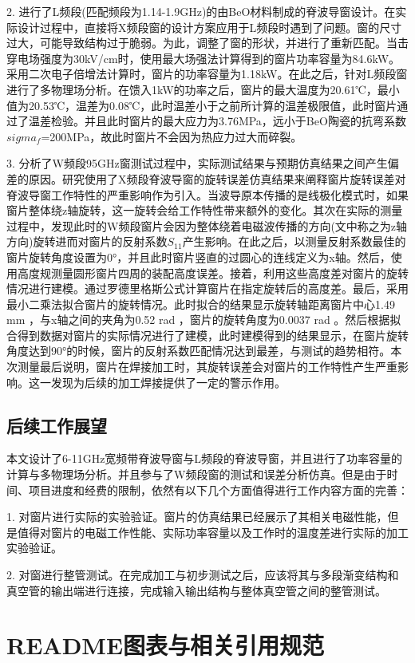 \documentclass[master]{thesis-uestc}
\begin{document}
2. 进行了L频段(匹配频段为1.14-1.9GHz)的由BeO材料制成的脊波导窗设计。在实际设计过程中，直接将X频段窗的设计方案应用于L频段时遇到了问题。窗的尺寸过大，可能导致结构过于脆弱。为此，调整了窗的形状，并进行了重新匹配。当击穿电场强度为30kV/cm时，使用最大场强法计算得到的窗片功率容量为84.6kW。采用二次电子倍增法计算时，窗片的功率容量为1.18kW。在此之后，针对L频段窗进行了多物理场分析。在馈入1kW的功率之后，窗片的最大温度为20.61℃，最小值为20.53℃，温差为0.08℃，此时温差小于之前所计算的温差极限值，此时窗片通过了温差检验。并且此时窗片的最大应力为3.76MPa，远小于BeO陶瓷的抗弯系数\(sigma_f\)=200MPa，故此时窗片不会因为热应力过大而碎裂。

3. 分析了W频段95GHz窗测试过程中，实际测试结果与预期仿真结果之间产生偏差的原因。研究使用了X频段脊波导窗的旋转误差仿真结果来阐释窗片旋转误差对脊波导窗工作特性的严重影响作为引入。当波导原本传播的是线极化模式时，如果窗片整体绕z轴旋转，这一旋转会给工作特性带来额外的变化。其次在实际的测量过程中，发现此时的W频段窗片会因为整体绕着电磁波传播的方向(文中称之为z轴方向)旋转进而对窗片的反射系数\(S_{11}\)产生影响。在此之后，以测量反射系数最佳的窗片旋转角度设置为0°，并且此时窗片竖直的过圆心的连线定义为x轴。然后，使用高度规测量圆形窗片四周的装配高度误差。接着，利用这些高度差对窗片的旋转情况进行建模。通过罗德里格斯公式计算窗片在指定旋转后的高度差。最后，采用最小二乘法拟合窗片的旋转情况。此时拟合的结果显示旋转轴距离窗片中心1.49 mm ，与x轴之间的夹角为0.52 rad ，窗片的旋转角度为0.0037 rad 。然后根据拟合得到数据对窗片的实际情况进行了建模，此时建模得到的结果显示，在窗片旋转角度达到90°的时候，窗片的反射系数匹配情况达到最差，与测试的趋势相符。本次测量最后说明，窗片在焊接加工时，其旋转误差会对窗片的工作特性产生严重影响。这一发现为后续的加工焊接提供了一定的警示作用。

\section{后续工作展望}
本文设计了6-11GHz宽频带脊波导窗与L频段的脊波导窗，并且进行了功率容量的计算与多物理场分析。并且参与了W频段窗的测试和误差分析仿真。但是由于时间、项目进度和经费的限制，依然有以下几个方面值得进行工作内容方面的完善：

1. 对窗片进行实际的实验验证。窗片的仿真结果已经展示了其相关电磁性能，但是值得对窗片的电磁工作性能、实际功率容量以及工作时的温度差进行实际的加工实验验证。

2. 对窗进行整管测试。在完成加工与初步测试之后，应该将其与多段渐变结构和真空管的输出端进行连接，完成输入输出结构与整体真空管之间的整管测试。

\chapter{README图表与相关引用规范}
\end{document}
